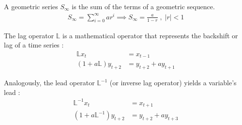 \documentclass[../thesis.tex]{subfiles}
\begin{document}

\begin{definition} \label{def:geometric-series}
	
	A geometric series $S_\infty$ is the sum of the terms of a geometric sequence.
	\begin{align*}
		S_\infty = \sum_{i=0}^{\infty} ar^i \implies 
		S_\infty = \frac{a}{1-r} \; , \; |r| <1
	\end{align*}	
	
\end{definition}


\begin{definition} \label{def:lag-operator}
	The lag operator $\mathbb{L}$ is a mathematical operator that represents the backshift or lag of a time series \cite[Lecture 13, p.9]{solis-garcia_ucb_2022}:
	\begin{align*}
		\mathbb{L} x_t           & = x_{t-1}              \\
		(1 + a\mathbb{L})y_{t+2} & = y_{t+2} + ay_{t+1}
	\end{align*}
\end{definition}

\begin{corollary} \label{coro:lead-operator}
	Analogously, the lead operator $\mathbb{L}^{-1}$ (or inverse lag operator) yields a variable's lead \cite[Lecture 13, p.9]{solis-garcia_ucb_2022}:
	\begin{align*}
		\mathbb{L}^{-1} x_t            & = x_{t+1}              \\
		(1 + a\mathbb{L}^{-1}) y_{t+2} & = y_{t+2} + ay_{t+3}
	\end{align*}
\end{corollary}
\end{document}
